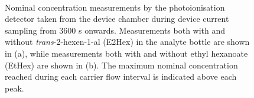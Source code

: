 \documentclass[
  a4paper,
]{scrbook}
\begin{document}
\begin{figure}
\begin{minipage}[t]{0.01\linewidth}
\end{minipage}%
%
\begin{minipage}[t]{0.70\linewidth}

{\centering 


}

\end{minipage}%
%
\begin{minipage}[t]{0.15\linewidth}

{\centering 

~

}

\end{minipage}%

\caption{\label{fig-EtHex-sampling-PID}Nominal concentration
measurements by the photoionisation detector taken from the device
chamber during device current sampling from 3600 s onwards. Measurements
both with and without \emph{trans}-2-hexen-1-al (E2Hex) in the analyte
bottle are shown in (a), while measurements both with and without ethyl
hexanoate (EtHex) are shown in (b). The maximum nominal concentration
reached during each carrier flow interval is indicated above each peak.}

\end{figure}
\end{document}
